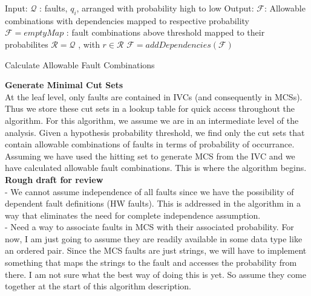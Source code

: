 \begin{algorithm}[H]
	Input: $\mathcal{Q}$ : faults, $q_i$, arranged with probability high to low \;
	Output: $\mathcal{F}$: Allowable combinations with dependencies mapped to respective probability \;
	$\mathcal{F} = emptyMap$ : fault combinations above threshold mapped to their probabilites \;
	$\mathcal{R} = \mathcal{Q}$ , with $r \in \mathcal{R}$\;
	$\mathcal{F} = addDependencies(\mathcal{F})$ \;
	\caption{Calculate Allowable Fault Combinations}
\end{algorithm}



\textbf{Generate Minimal Cut Sets}\\

At the leaf level, only faults are contained in IVCs (and consequently in MCSs). Thus we store these cut sets in a lookup table for quick access throughout the algorithm. For this algorithm, we assume we are in an intermediate level of the analysis. Given a hypothesis probability threshold, we find only the cut sets that contain allowable combinations of faults in terms of probability of occurrance.\\

Assuming we have used the hitting set to generate MCS from the IVC and we have calculated allowable fault combinations. This is where the algorithm begins. \\

\textbf{Rough draft for review}\\

- We cannot assume independence of all faults since we have the possibility of dependent fault definitions (HW faults). This is addressed in the algorithm in a way that eliminates the need for complete independence assumption. \\
- Need a way to associate faults in MCS with their associated probability. For now, I am just going to assume they are readily available in some data type like an ordered pair. Since the MCS faults are just strings, we will have to implement something that maps the strings to the fault and accesses the probability from there. I am not sure what the best way of doing this is yet. So assume they come together at the start of this algorithm description.\\


